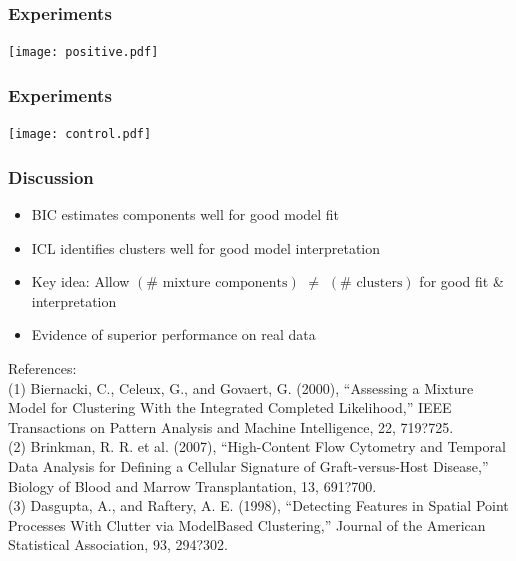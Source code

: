 \documentclass[mathserif,compress]{beamer}
\renewcommand\;{\,}
\begin{document}
\begin{frame}\frametitle{Experiments}
\begin{center}
\texttt{[image: positive.pdf]}
\end{center}
\end{frame}

\begin{frame}\frametitle{Experiments}
\begin{center}
\texttt{[image: control.pdf]}
\end{center}
\end{frame}

\begin{frame}\frametitle{Discussion}
\begin{itemize}
\item
BIC estimates components well for good model fit
\medskip
\item
ICL identifies clusters well for good model interpretation
\medskip
\item
Key idea: Allow $\left(\# \text{ mixture components}\right)$ 
$\ne$ 
$\left(\# \text{ clusters} \right)$ for good fit \& interpretation
\medskip
\item
Evidence of superior performance on real data 
\end{itemize}
\medskip
References:
\\
\medskip
\tiny
(1)
Biernacki, C., Celeux, G., and Govaert, G. (2000), ``Assessing a Mixture Model for Clustering With the Integrated
Completed Likelihood,'' IEEE Transactions on Pattern Analysis and Machine Intelligence, 22, 719?725.
\\ \smallskip
(2) Brinkman, R. R. et al. (2007), ``High-Content Flow Cytometry and Temporal Data Analysis for Defining a Cellular Signature of
Graft-versus-Host Disease,'' Biology of Blood and Marrow Transplantation, 13, 691?700.
\\ \smallskip
(3) Dasgupta, A., and Raftery, A. E. (1998), ``Detecting Features in Spatial Point Processes With Clutter via ModelBased
Clustering,'' Journal of the American Statistical Association, 93, 294?302. 
\end{frame}
\end{document}
